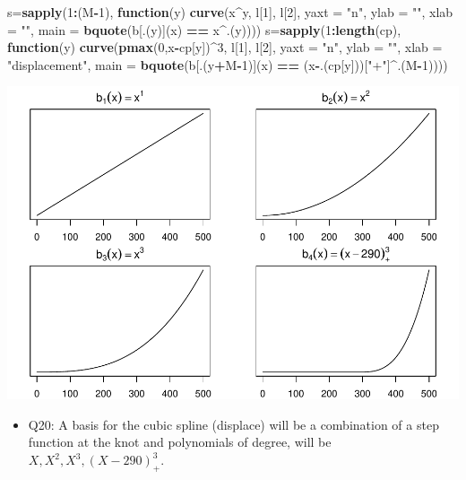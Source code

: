 \documentclass[]{article}
\newenvironment{Shaded}{\begin{snugshade}}{\end{snugshade}}
\newcommand{\KeywordTok}[1]{\textcolor[rgb]{0.13,0.29,0.53}{\textbf{#1}}}
\newcommand{\DataTypeTok}[1]{\textcolor[rgb]{0.13,0.29,0.53}{#1}}
\newcommand{\DecValTok}[1]{\textcolor[rgb]{0.00,0.00,0.81}{#1}}
\newcommand{\StringTok}[1]{\textcolor[rgb]{0.31,0.60,0.02}{#1}}
\newcommand{\ControlFlowTok}[1]{\textcolor[rgb]{0.13,0.29,0.53}{\textbf{#1}}}
\newcommand{\OperatorTok}[1]{\textcolor[rgb]{0.81,0.36,0.00}{\textbf{#1}}}
\newcommand{\NormalTok}[1]{#1}
\providecommand{\tightlist}{%
  \setlength{\itemsep}{0pt}\setlength{\parskip}{0pt}}
\begin{document}
\begin{Shaded}
\begin{Highlighting}[]
\NormalTok{s=}\KeywordTok{sapply}\NormalTok{(}\DecValTok{1}\OperatorTok{:}\NormalTok{(M}\OperatorTok{-}\DecValTok{1}\NormalTok{), }\ControlFlowTok{function}\NormalTok{(y) }\KeywordTok{curve}\NormalTok{(x}\OperatorTok{^}\NormalTok{y, l[}\DecValTok{1}\NormalTok{], l[}\DecValTok{2}\NormalTok{], }\DataTypeTok{yaxt =} \StringTok{"n"}\NormalTok{,}
 \DataTypeTok{ylab =} \StringTok{""}\NormalTok{, }\DataTypeTok{xlab =} \StringTok{""}\NormalTok{, }\DataTypeTok{main =} \KeywordTok{bquote}\NormalTok{(b[.(y)](x) }\OperatorTok{==}\StringTok{ }\NormalTok{x}\OperatorTok{^}\NormalTok{.(y))))}
\NormalTok{s=}\KeywordTok{sapply}\NormalTok{(}\DecValTok{1}\OperatorTok{:}\KeywordTok{length}\NormalTok{(cp), }\ControlFlowTok{function}\NormalTok{(y) }\KeywordTok{curve}\NormalTok{(}\KeywordTok{pmax}\NormalTok{(}\DecValTok{0}\NormalTok{,x}\OperatorTok{-}\NormalTok{cp[y])}\OperatorTok{^}\DecValTok{3}\NormalTok{, l[}\DecValTok{1}\NormalTok{], l[}\DecValTok{2}\NormalTok{], }\DataTypeTok{yaxt =} \StringTok{"n"}\NormalTok{,}
 \DataTypeTok{ylab =} \StringTok{""}\NormalTok{, }\DataTypeTok{xlab =} \StringTok{"displacement"}\NormalTok{, }\DataTypeTok{main =} \KeywordTok{bquote}\NormalTok{(b[.(y}\OperatorTok{+}\NormalTok{M}\OperatorTok{-}\DecValTok{1}\NormalTok{)](x) }\OperatorTok{==}\StringTok{ }\NormalTok{(x}\OperatorTok{-}\NormalTok{.(cp[y]))[}\StringTok{"+"}\NormalTok{]}\OperatorTok{^}\NormalTok{.(M}\OperatorTok{-}\DecValTok{1}\NormalTok{))))}
\end{Highlighting}
\end{Shaded}

\includegraphics{Project2_files/figure-latex/unnamed-chunk-10-2.pdf}

\begin{itemize}
\tightlist
\item
  Q20: A basis for the cubic spline (displace) will be a combination of
  a step function at the knot and polynomials of degree, will be
  \(X, X^2, X^3, (X-290)^3_+\).
\end{itemize}
\end{document}

